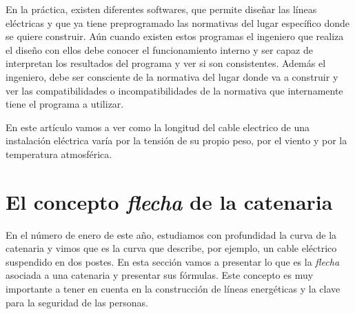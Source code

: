 En la práctica, existen diferentes softwares, que permite diseñar las
líneas eléctricas y que ya tiene preprogramado las normativas del
lugar específico donde se quiere construir.  Aún cuando existen estos
programas el ingeniero que realiza el diseño con ellos debe conocer el
funcionamiento interno y ser capaz de interpretan los resultados del
programa y ver si son consistentes. Además el ingeniero, debe ser
consciente de la normativa del lugar donde va a construir y ver las
compatibilidades o incompatibilidades de la normativa que internamente
tiene el programa a utilizar.

En este artículo vamos a ver como la longitud del cable electrico de
una instalación eléctrica varía por la tensión de su propio peso, por
el viento y por la temperatura atmosférica.


\section{El concepto \emph{flecha}  de la catenaria}
\label{sec:parabola-vs-catenara}

En el número de enero de este año, estudiamos con profundidad la curva
de la catenaria y vimos que es la curva que describe, por ejemplo, un
cable eléctrico suspendido en dos postes. En esta sección vamos a
presentar lo que es la \emph{flecha} asociada a una catenaria y
presentar sus fórmulas. Este concepto es muy importante a tener en
cuenta en la construcción de líneas energéticas y la clave para la
seguridad de las personas.

